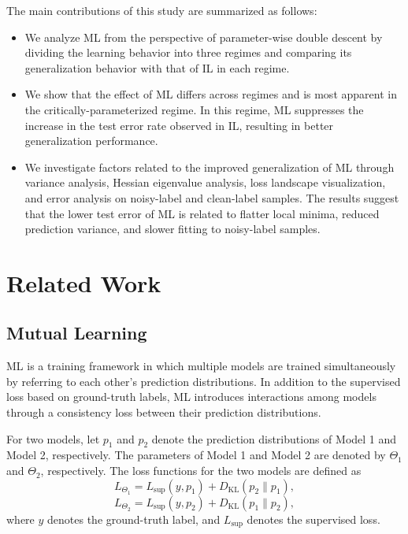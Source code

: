 \documentclass[dvipdfmx]{nolta}        %
\begin{document}
The main contributions of this study are summarized as follows:
\begin{itemize}
\item We analyze ML from the perspective of parameter-wise double descent by dividing the learning behavior into three regimes and comparing its generalization behavior with that of IL in each regime.

\item We show that the effect of ML differs across regimes and is most apparent in the critically-parameterized regime. In this regime, ML suppresses the increase in the test error rate observed in IL, resulting in better generalization performance.

\item We investigate factors related to the improved generalization of ML through variance analysis, Hessian eigenvalue analysis, loss landscape visualization, and error analysis on noisy-label and clean-label samples. The results suggest that the lower test error of ML is related to flatter local minima, reduced prediction variance, and slower fitting to noisy-label samples.
\end{itemize}

\section{Related Work}
\subsection{Mutual Learning}

ML is a training framework in which multiple models are trained simultaneously by referring to each other's prediction distributions. In addition to the supervised loss based on ground-truth labels, ML introduces interactions among models through a consistency loss between their prediction distributions.

For two models, let $p_1$ and $p_2$ denote the prediction distributions of Model 1 and Model 2, respectively.
The parameters of Model 1 and Model 2 are denoted by $\Theta_1$ and $\Theta_2$, respectively.
The loss functions for the two models are defined as
\begin{equation}
L_{\Theta_1} = L_{\mathrm{sup}}(y, p_1) + D_{\mathrm{KL}}(p_2 \| p_1),
\end{equation}
\begin{equation}
L_{\Theta_2} = L_{\mathrm{sup}}(y, p_2) + D_{\mathrm{KL}}(p_1 \| p_2),
\end{equation}
where $y$ denotes the ground-truth label, and $L_{\mathrm{sup}}$ denotes the supervised loss.
\end{document}

